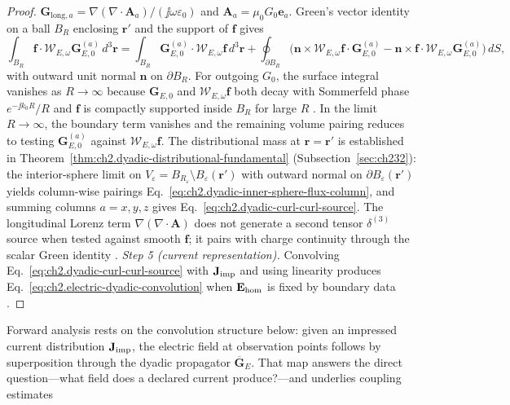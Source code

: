 \begin{proof}
$\mathbf{G}_{\mathrm{long},a}=\nabla(\nabla\cdot\mathbf{A}_a)/(\jj\omega\varepsilon_0)$ and
$\mathbf{A}_a=\mu_0 G_0\mathbf{e}_a$.
Green's vector identity on a ball $B_R$ enclosing $\mathbf{r}'$ and the support of $\mathbf{f}$ gives
\begin{equation}
\label{eq:ch2.dyadic-green-ibp}
\int_{B_R}\mathbf{f}\cdot\mathcal{W}_{E,\omega}\mathbf{G}_{E,0}^{(a)}\,d^{3}\mathbf{r}
=
\int_{B_R}\mathbf{G}_{E,0}^{(a)}\cdot\mathcal{W}_{E,\omega}\mathbf{f}\,d^{3}\mathbf{r}
+\oint_{\partial B_R}\big(\mathbf{n}\times\mathcal{W}_{E,\omega}\mathbf{f}\cdot\mathbf{G}_{E,0}^{(a)}
-\mathbf{n}\times\mathbf{f}\cdot\mathcal{W}_{E,\omega}\mathbf{G}_{E,0}^{(a)}\big)\,dS,
\end{equation}
with outward unit normal $\mathbf{n}$ on $\partial B_R$.
For outgoing $G_0$, the surface integral vanishes as $R\to\infty$ because $\mathbf{G}_{E,0}$ and $\mathcal{W}_{E,\omega}\mathbf{f}$ both decay with Sommerfeld phase $e^{-\jj k_0 R}/R$ and $\mathbf{f}$ is compactly supported inside $B_R$ for large $R$ \cite{jackson1999}.
In the limit $R\to\infty$, the boundary term vanishes and the remaining volume pairing reduces to testing $\mathbf{G}_{E,0}^{(a)}$ against $\mathcal{W}_{E,\omega}\mathbf{f}$.
The distributional mass at $\mathbf{r}=\mathbf{r}'$ is established in Theorem~\ref{thm:ch2.dyadic-distributional-fundamental} (Subsection~\ref{sec:ch232}): the interior-sphere limit on $V_\varepsilon=B_{R_\varepsilon}\setminus B_\varepsilon(\mathbf{r}')$ with outward normal on $\partial B_\varepsilon(\mathbf{r}')$ yields column-wise pairings Eq.~\eqref{eq:ch2.dyadic-inner-sphere-flux-column}, and summing columns $a=x,y,z$ gives Eq.~\eqref{eq:ch2.dyadic-curl-curl-source}.
The longitudinal Lorenz term $\nabla(\nabla\cdot\mathbf{A})$ does not generate a second tensor $\delta^{(3)}$ source when tested against smooth $\mathbf{f}$; it pairs with charge continuity through the scalar Green identity \cite{stratton1941,tai1994}.
\emph{Step 5 (current representation).} Convolving Eq.~\eqref{eq:ch2.dyadic-curl-curl-source} with $\mathbf{J}_{\mathrm{imp}}$ and using linearity produces Eq.~\eqref{eq:ch2.electric-dyadic-convolution} when $\mathbf{E}_{\mathrm{hom}}$ is fixed by boundary data \cite{harrington2001}.
\end{proof}
Forward analysis rests on the convolution structure below: given an impressed current
distribution $\mathbf{J}_{\mathrm{imp}}$, the electric field at observation points follows by superposition
through the dyadic propagator $\overline{\mathbf{G}}_{E}$. That map answers the direct
question---what field does a declared current produce?---and underlies coupling estimates
